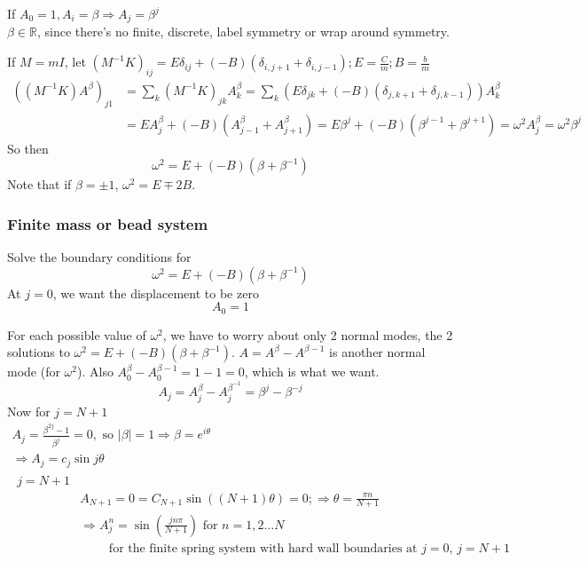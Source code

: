 \documentclass[twoside, 10pt]{amsart}
\begin{document}
If $A_0 = 1, A_i = \beta \Longrightarrow A_j = \beta^j $  \medskip \\
$\beta \in \mathbb{R}$, since there's no finite, discrete, label symmetry or wrap around symmetry.  

If $M=mI$, let $(M^{-1}K)_{ij} =E \delta_{ij} + (-B)(\delta_{i,j+1}+\delta_{i,j-1}); E = \frac{C}{m}; B=\frac{b}{m}$
\[
\begin{aligned}
  ((M^{-1}K)A^{\beta})_{j1} & = \sum_k (M^{-1} K)_{jk}A_k^{\beta} = \sum_k (E \delta_{jk} + (-B)(\delta_{j,k+1} + \delta_{j,k-1} )) A_k^{\beta}  \\
  & = EA_j^{\beta} + (-B)(A_{j-1}^{\beta} +A_{j+1}^{\beta}) = E \beta^j + (-B)(\beta^{j-1} + \beta^{j+1}) = \omega^2 A_j^{\beta} = \omega^2 \beta^j 
\end{aligned}
\]
So then
\begin{equation}
  \omega^2 = E + (-B)(\beta+\beta^{-1})
\end{equation}
Note that if $\beta = \pm 1$, $\omega^2 = E \mp 2B$.  

\subsubsection{ Finite mass or bead system}

Solve the boundary conditions for 
\[
\omega^2 = E + (-B)(\beta+\beta^{-1})
\]
At $j=0$, we want the displacement to be zero
\begin{equation}
  A_0=1
\end{equation}

For each possible value of $\omega^2$, we have to worry about only 2 normal modes, the 2 solutions to $\omega^2 = E +(-B)(\beta + \beta^{-1})$.  
$A=A^{\beta} - A^{\beta-1}$ is another normal mode (for $\omega^2$).  Also $A_0^{\beta} - A_0^{\beta-1} = 1-1=0$, which is what we want.  
\[
A_j = A_j^{\beta}-A_{j}^{\beta^{-1}} = \beta^j -\beta^{-j}
\]
Now for $j=N+1$
\[
\begin{gathered}
  A_j = \frac{ \beta^{2j} - 1}{ \beta^j} = 0, \text{ so } |\beta | = 1 \Longrightarrow \beta = e^{i\theta}  \\
  \Longrightarrow A_j = c_j \sin{j \theta}  \\
 \begin{aligned}
   j = N+1 &  \\
   & A_{N+1} = 0 = C_{N+1} \sin{ ((N+1)\theta) } = 0; \Longrightarrow \theta = \frac{ \pi n}{ N+1}  \\
   & \Longrightarrow A_j^n =\sin{ \left( \frac{  jn\pi}{ N+1 } \right) } \text{ for } n=1,2 \dots N \\ 
   & \quad \quad \text{ for the finite spring system with hard wall boundaries at $j=0$, $j=N+1$ }
 \end{aligned}
\end{gathered}
\]
\end{document}
